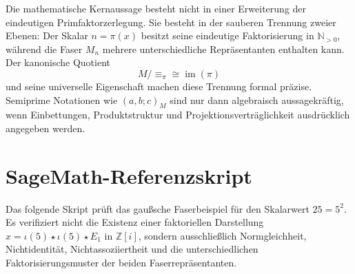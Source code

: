 \documentclass[11pt,a4paper,reqno]{amsart}
\theoremstyle{definition}
\theoremstyle{remark}
\newcommand{\Npos}{\mathbb{N}_{>0}}
\newcommand{\Z}{\mathbb{Z}}
\newcommand{\im}{\operatorname{im}}
\begin{document}
Die mathematische Kernaussage besteht nicht in einer Erweiterung der eindeutigen Primfaktorzerlegung. Sie besteht in der sauberen Trennung zweier Ebenen: Der Skalar $n=\pi(x)$ besitzt seine eindeutige Faktorisierung in $\Npos$, während die Faser $M_n$ mehrere unterschiedliche Repräsentanten enthalten kann. Der kanonische Quotient
\[
  M/{\equiv_\pi}\cong\im(\pi)
\]
und seine universelle Eigenschaft machen diese Trennung formal präzise. Semiprime Notationen wie $(a,b;c)_M$ sind nur dann algebraisch aussagekräftig, wenn Einbettungen, Produktstruktur und Projektionsverträglichkeit ausdrücklich angegeben werden.

\appendix
\section{SageMath-Referenzskript}

Das folgende Skript prüft das gaußsche Faserbeispiel für den Skalarwert $25=5^2$. Es verifiziert nicht die Existenz einer faktoriellen Darstellung $x=\iota(5)\star\iota(5)\star E_1$ in $\Z[i]$, sondern ausschließlich Normgleichheit, Nichtidentität, Nichtassoziiertheit und die unterschiedlichen Faktorisierungsmuster der beiden Faserrepräsentanten.
\end{document}

